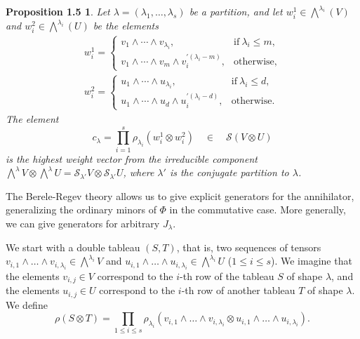\documentclass{tran-l}
\theoremstyle{plain}
\newtheorem*{theorem7}{Proposition 1.5}
\theoremstyle{remark}
\theoremstyle{definition}
\newcommand{\myS}{{\mathcal S}}
\begin{document}
\begin{theorem7}
Let
$\lambda = (\lambda _{1} ,\ldots ,\lambda _{s})$
be a partition, and let
$w^{1}_{i}\in \bigwedge ^{\lambda _{i}}(V)$ and
$w^{2}_{i}\in \bigwedge ^{\lambda _{i}}(U)$ be the elements
\begin{gather*}
w_{i}^{1} = \begin{cases}
v_1\wedge \dotsb \wedge v_{\lambda_i},&\text{if}\ \lambda_i\le m,\\
v_1\wedge \dotsb \wedge v_m\wedge v_i^{\prime(\lambda_i-m)},&\text{otherwise},
\end{cases}\\
w_{i}^{2} = 
\begin{cases}
u_1\wedge \dotsb \wedge u_{\lambda_i},&\text{if}\ \lambda_i\le d,\\
u_1\wedge \dotsb \wedge u_d\wedge u_i^{\prime(\lambda_i-d)},&\text{otherwise}.
\end{cases}
\end{gather*}
The element
\begin{equation*}c_{\lambda }= \prod _{i=1}^{s} \rho _{\lambda _{i}} (w_{i}^{1}\otimes w_{i}^{2} )
\quad \in \quad \myS (V\otimes U)
\end{equation*}
is the  highest weight vector from the irreducible component
$\bigwedge ^{\lambda }V\otimes \bigwedge ^{\lambda }U
= \myS _{\lambda '} V\otimes \myS _{\lambda '} U$,
where
$\lambda '$
is the conjugate partition to $\lambda $.
\end{theorem7}


The Berele-Regev theory allows us to give explicit
generators for the annihilator, generalizing the 
ordinary minors of $\Phi $ in the commutative case.
More generally, we can give generators for arbitrary
$J_{\lambda }$. 

We start with a double tableau $(S,T)$,
 that is, two sequences of tensors
$v_{i,1}\wedge \ldots \wedge v_{i,\lambda _{i} }\in \bigwedge ^{\lambda _{i}} V$ 
and 
$u_{i,1}\wedge \ldots \wedge u_{i,\lambda _{i}}\in \bigwedge ^{\lambda _{i}}U$ 
($1\le i\le s$). We imagine that the elements
$v_{i,j}\in V$ correspond to the $i$-th row of the tableau 
$S$ of shape $\lambda $, 
and the elements $u_{i,j}\in U$ correspond to the $i$-th row of
another tableau $T$ of shape $\lambda $. 
We define
\begin{equation*}\rho (S\otimes T)= 
\prod _{1\le i\le s} \rho _{\lambda _{i}}(v_{i,1}
\wedge \ldots \wedge v_{i,\lambda _{i}}\otimes u_{i,1}\wedge \ldots \wedge u_{i,\lambda _{i}}).
\end{equation*}
\end{document}
